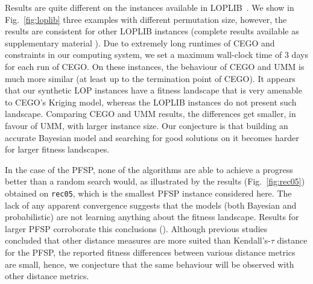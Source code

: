\documentclass[runningheads]{llncs}
\begin{document}
Results are quite different on the 
instances available in LOPLIB~\citep{}. We show in
Fig.~\ref{fig:loplib} three examples with different permutation size, however,
the results are consistent for other LOPLIB instances (complete results
available as supplementary material \supplement). Due to extremely long
runtimes of CEGO and constraints in our computing system, we set a maximum
wall-clock time of 3 days for each run of CEGO. On these instances, the
behaviour of CEGO and UMM is much more similar (at least up to the termination
point of CEGO). It appears that our synthetic LOP instances have a fitness
landscape that is very amenable to CEGO's Kriging model, whereas the LOPLIB
instances do not present such landscape. Comparing CEGO and UMM results, the
differences get smaller, in favour of UMM, with larger instance size. Our
conjecture is that building an accurate Bayesian model and searching for good
solutions on it becomes harder for larger fitness landscapes.

In the case of the PFSP, none of the algorithms are able to achieve a progress
better than a random search would, as illustrated by the results
(Fig.~\ref{fig:rec05}) obtained on \texttt{rec05}, which is the smallest PFSP
instance considered here. The lack of any apparent convergence suggests that
the models (both Bayesian and probabilistic) are not learning anything about
the fitness landscape. Results for larger PFSP corroborate this conclusions
(\supplement). Although previous studies~\citep{ZaeStoBar2014:ppsn} concluded
that other distance measures are more suited than Kendall's-$\tau$ distance for
the PFSP, the reported fitness differences between various distance metrics are
small, hence, we conjecture that the same behaviour will be observed with other
distance metrics.
  
\end{document}
